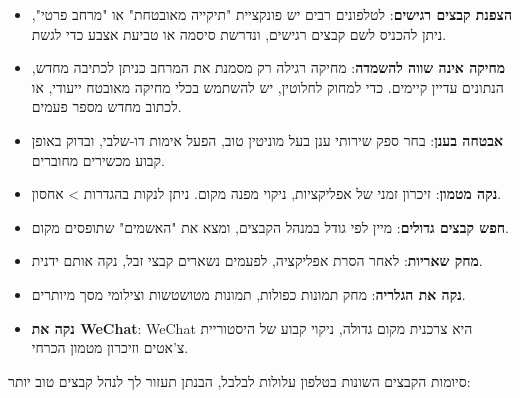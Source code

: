 
\begin{itemize}
  \item \textbf{הצפנת קבצים רגישים}: לטלפונים רבים יש פונקציית "תיקייה מאובטחת" או "מרחב פרטי", ניתן להכניס לשם קבצים רגישים, ונדרשת סיסמה או טביעת אצבע כדי לגשת.
  \item \textbf{מחיקה אינה שווה להשמדה}: מחיקה רגילה רק מסמנת את המרחב כניתן לכתיבה מחדש, הנתונים עדיין קיימים. כדי למחוק לחלוטין, יש להשתמש בכלי מחיקה מאובטח ייעודי, או לכתוב מחדש מספר פעמים.
  \item \textbf{אבטחה בענן}: בחר ספק שירותי ענן בעל מוניטין טוב, הפעל אימות דו-שלבי, ובדוק באופן קבוע מכשירים מחוברים.
\end{itemize}


\begin{itemize}
  \item \textbf{נקה מטמון}: זיכרון זמני של אפליקציות, ניקוי מפנה מקום. ניתן לנקות בהגדרות > אחסון.
  \item \textbf{חפש קבצים גדולים}: מיין לפי גודל במנהל הקבצים, ומצא את "האשמים" שתופסים מקום.
  \item \textbf{מחק שאריות}: לאחר הסרת אפליקציה, לפעמים נשארים קבצי זבל, נקה אותם ידנית.
  \item \textbf{נקה את הגלריה}: מחק תמונות כפולות, תמונות מטושטשות וצילומי מסך מיותרים.
  \item \textbf{נקה את WeChat}: WeChat היא צרכנית מקום גדולה, ניקוי קבוע של היסטוריית צ'אטים וזיכרון מטמון הכרחי.
\end{itemize}


סיומות הקבצים השונות בטלפון עלולות לבלבל, הבנתן תעזור לך לנהל קבצים טוב יותר:

